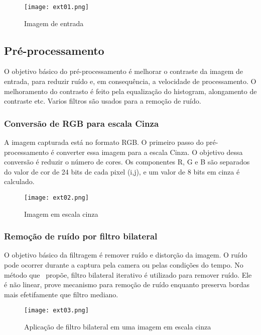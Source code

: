 \begin{figure}[H]
	\centering
	\texttt{[image: ext01.png]}
	\caption{Imagem de entrada}
	\label{fig:ext_input_image}
\end{figure}

\subsection{Pré-processamento}

O objetivo básico do pré-processamento é melhorar o contraste da imagem de
entrada, para reduzir ruído e, em consequência, a velocidade de
processamento. O melhoramento do contrasto é feito pela equalização do
histogram, alongamento de contraste etc. Varios filtros são usados para a
remoção de ruído.

\subsubsection{Conversão de RGB para escala Cinza}

A imagem capturada está no formato RGB\@. O primeiro passo do pré-processamento é
converter essa imagem para a escala Cinza. O objetivo dessa conversão é reduzir
o número de cores. Os componentes R, G e B são separados do valor de cor de 24
bits de cada pixel (i,j), e um valor de 8 bits em cinza é calculado.

\begin{figure}[H]
	\centering
	\texttt{[image: ext02.png]}
	\caption{Imagem em escala cinza}
	\label{fig:ext_gray_scale}
\end{figure}

\subsubsection{Remoção de ruído por filtro bilateral}

O objetivo básico da filtragem é remover ruído e distorção da imagem. O ruído
pode ocorrer durante a captura pela camera ou pelas condições do tempo. No
método que~\cite{kaur2014efficient} propõe, filtro bilateral iterativo é
utilizado para remover ruído. Ele é não linear, prove mecanismo para remoção de
ruído enquanto preserva bordas mais efetifamente que filtro mediano.

\begin{figure}[H]
	\centering
	\texttt{[image: ext03.png]}
	\caption{Aplicação de filtro bilateral em uma imagem em escala cinza}
	\label{fig:ext_filter_in_gray_scale}
\end{figure}

